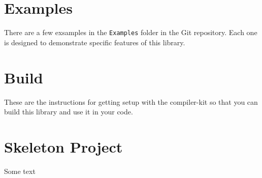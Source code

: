 \documentclass[10pt,a4paper,hidelinks]{article}
\begin{document}
\section{Examples}

There are a few exsamples in the \texttt{Examples} folder in the Git repository.
Each one is designed to demonstrate specific features of this library.

\newpage
\begin{appendices}
\section{Build}
These are the instructions for getting setup with the compiler-kit so that you
can build this library and use it in your code.

\section{Skeleton Project}
Some text
\end{appendices}
\end{document}
